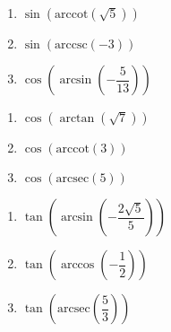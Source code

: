 \begin{multicols}{3}

\begin{enumerate}

\setcounter{enumi}{\value{HW}}

\item  $\sin\left(\text{arccot}\left(\sqrt{5}\right)\right)$ 
\item  $\sin\left(\text{arccsc}\left(-3\right)\right)$ 
\item  $\cos\left(\arcsin\left(-\dfrac{5}{13}\right)\right)$

\setcounter{HW}{\value{enumi}}

\end{enumerate}

\end{multicols}

\begin{multicols}{3}

\begin{enumerate}

\setcounter{enumi}{\value{HW}}

\item  $\cos\left(\arctan\left(\sqrt{7} \right)\right)$
\item  $\cos\left(\text{arccot}\left( 3 \right)\right)$
\item  $\cos\left(\text{arcsec}\left( 5 \right)\right)$

\setcounter{HW}{\value{enumi}}

\end{enumerate}

\end{multicols}

\begin{multicols}{3}

\begin{enumerate}

\setcounter{enumi}{\value{HW}}

\item  $\tan\left(\arcsin\left(-\dfrac{2\sqrt{5}}{5}\right)\right)$
\item  $\tan\left(\arccos\left(-\dfrac{1}{2}\right)\right)$ 
\item  $\tan\left(\text{arcsec}\left(\dfrac{5}{3}\right)\right)$ 

\setcounter{HW}{\value{enumi}}

\end{enumerate}

\end{multicols}

